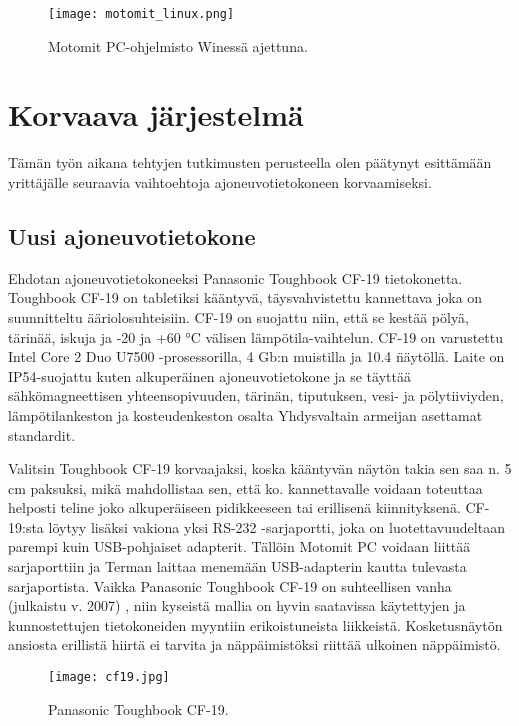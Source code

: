\begin{figure}[H]
\centering
\texttt{[image: motomit\_linux.png]}
\caption{Motomit PC-ohjelmisto Winessä ajettuna.}
\end{figure}

\newpage

\chapter{Korvaava järjestelmä}
\label{ch:korvaava_jarjestelma}

Tämän työn aikana tehtyjen tutkimusten perusteella olen päätynyt esittämään yrittäjälle seuraavia vaihtoehtoja ajoneuvotietokoneen korvaamiseksi.

\section{Uusi ajoneuvotietokone}

Ehdotan ajoneuvotietokoneeksi Panasonic Toughbook CF-19 tietokonetta. Toughbook CF-19 on tabletiksi kääntyvä, täysvahvistettu kannettava joka on suunnitteltu ääriolosuhteisiin. CF-19 on suojattu niin, että se kestää pölyä, tärinää, iskuja ja -20 ja +60 °C välisen lämpötila-vaihtelun. CF-19 on varustettu Intel Core 2 Duo U7500 -prosessorilla, 4 Gb:n muistilla ja 10.4 \" näytöllä. Laite on IP54-suojattu kuten alkuperäinen ajoneuvotietokone ja se täyttää sähkömagneettisen yhteensopivuuden, tärinän, tiputuksen, vesi- ja pölytiiviyden, lämpötilankeston ja kosteudenkeston osalta Yhdysvaltain armeijan asettamat standardit. \cite{cf19}

Valitsin Toughbook CF-19 korvaajaksi, koska kääntyvän näytön takia sen saa n. 5 cm paksuksi, mikä mahdollistaa sen, että ko. kannettavalle voidaan toteuttaa helposti teline joko alkuperäiseen pidikkeeseen tai erillisenä kiinnityksenä. CF-19:sta löytyy lisäksi vakiona yksi RS-232 -sarjaportti, joka on luotettavuudeltaan parempi kuin USB-pohjaiset adapterit. Tällöin Motomit PC voidaan liittää sarjaporttiin ja Terman laittaa menemään USB-adapterin kautta tulevasta sarjaportista. Vaikka Panasonic Toughbook CF-19 on suhteellisen vanha (julkaistu v. 2007) \cite{cf19}, niin kyseistä mallia on hyvin saatavissa käytettyjen ja kunnostettujen tietokoneiden myyntiin erikoistuneista liikkeistä. Kosketusnäytön ansiosta erillistä hiirtä ei tarvita ja näppäimistöksi riittää ulkoinen näppäimistö.

\lipsum[1-5]

\begin{figure}[H]
\centering
\texttt{[image: cf19.jpg]}
\caption{Panasonic Toughbook CF-19.}
\end{figure}


